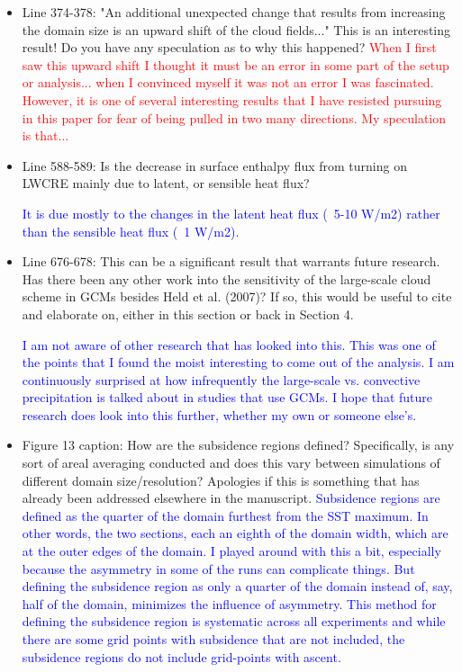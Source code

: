 \documentclass[draft]{agujournal2019}
\begin{document}
\begin{itemize}
  
  \item Line 374-378: "An additional unexpected change that results from increasing the domain size is an upward shift of the cloud fields..." This is an interesting result! Do you have any speculation as to why this happened?
  \textcolor{red}{When I first saw this upward shift I thought it must be an error in some part of the setup or analysis... when I convinced myself it was not an error I was fascinated.  However, it is one of several interesting results that I have resisted
  pursuing in this paper for fear of being pulled in two many directions.  My speculation is that...}
  
  \item Line 588-589: Is the decrease in surface enthalpy flux from turning on LWCRE mainly due to latent, or sensible heat flux?  
  
  \textcolor{blue}{It is due mostly to the changes in the latent heat flux (~5-10 W/m2) rather than the sensible heat flux (~1 W/m2).}

  \item Line 676-678: This can be a significant result that warrants future research. Has there been any other work into the sensitivity of the large-scale cloud scheme in GCMs besides Held et al. (2007)? If so, this would be useful to cite and elaborate on, either in this section or back in Section 4.  
  
  \textcolor{blue}{I am not aware of other research that has looked into this.  This was one of the points that I found the moist interesting to come out of the analysis.  I am continuously surprised at how infrequently the large-scale vs. convective precipitation is talked about in studies that use GCMs.  I hope that future research does look into this further, whether my own or someone else’s.}
  
  \item Figure 13 caption: How are the subsidence regions defined? Specifically, is any sort of areal averaging conducted and does this vary between simulations of different domain size/resolution? Apologies if this is something that has already been addressed elsewhere in the manuscript.   
  \textcolor{blue}{Subsidence regions are defined as the quarter of the domain furthest from the SST 
  maximum.  In other words, the two sections, each an eighth of the domain width, which are at the outer edges of the domain.  I played around with this a bit, 
  especially because the asymmetry in some of the runs can complicate things.  But defining the subsidence region as only a quarter of the domain instead of, 
  say, half of the domain, minimizes the influence of asymmetry.  This method for defining the subsidence region is systematic across all experiments and while 
  there are some grid points with subsidence that are not included, the subsidence regions do not include grid-points with ascent.}
  
\end{itemize}
\end{document}
